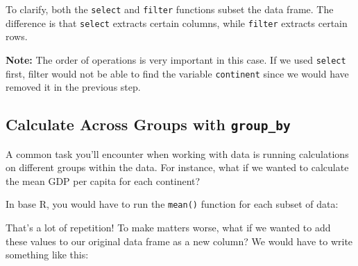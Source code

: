 \documentclass[]{book}
\newenvironment{Shaded}{\begin{snugshade}}{\end{snugshade}}
\newcommand{\KeywordTok}[1]{\textcolor[rgb]{0.13,0.29,0.53}{\textbf{#1}}}
\newcommand{\StringTok}[1]{\textcolor[rgb]{0.31,0.60,0.02}{#1}}
\newcommand{\CommentTok}[1]{\textcolor[rgb]{0.56,0.35,0.01}{\textit{#1}}}
\newcommand{\OperatorTok}[1]{\textcolor[rgb]{0.81,0.36,0.00}{\textbf{#1}}}
\newcommand{\NormalTok}[1]{#1}
\begin{document}
To clarify, both the \texttt{select} and \texttt{filter} functions
subset the data frame. The difference is that \texttt{select} extracts
certain columns, while \texttt{filter} extracts certain rows.

\textbf{Note:} The order of operations is very important in this case.
If we used \texttt{select} first, filter would not be able to find the
variable \texttt{continent} since we would have removed it in the
previous step.

\subsection{\texorpdfstring{Calculate Across Groups with
\texttt{group\_by}}{Calculate Across Groups with group\_by}}\label{calculate-across-groups-with-group_by}

A common task you'll encounter when working with data is running
calculations on different groups within the data. For instance, what if
we wanted to calculate the mean GDP per capita for each continent?

In base R, you would have to run the \texttt{mean()} function for each
subset of data:

\begin{Shaded}
\end{Shaded}

That's a lot of repetition! To make matters worse, what if we wanted to
add these values to our original data frame as a new column? We would
have to write something like this:
\end{document}
